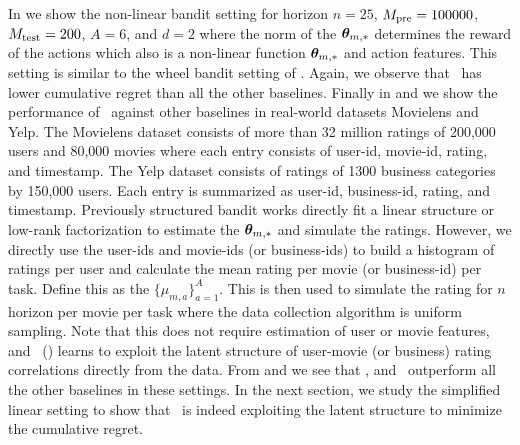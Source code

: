 \documentclass[10pt]{article}
\theoremstyle{plain}
\theoremstyle{definition}
\theoremstyle{remark}
\begin{document}
In  we show the non-linear bandit setting for horizon $n=25$, $M_{\text{pre}} = 100000$, $M_{\text{test}} = 200$, $A=6$, and $d=2$ where the norm of the $\boldsymbol{\theta}_{m,*}$ determines the reward of the actions which also is a non-linear function $\boldsymbol{\theta}_{m,*}$ and action features. This setting is similar to the wheel bandit setting of \citet{riquelme2018deep}. Again, we observe that \pred\ has lower cumulative regret than all the other baselines.
Finally in  and  we show the performance of \pred\ against other baselines in real-world datasets Movielens and Yelp. The Movielens dataset consists of more than 32 million ratings of 200,000 users and 80,000 movies \citep{harper2015movielens} where each entry consists of user-id, movie-id, rating, and timestamp. The Yelp dataset \citep{asghar2016yelp} consists of ratings of 1300 business categories by 150,000 users. Each entry is summarized as user-id, business-id, rating, and timestamp. Previously structured bandit works \citep{deshpande2012linear, hong2023multi} directly fit a linear structure or low-rank factorization to estimate the $\boldsymbol{\theta}_{m,*}$ and simulate the ratings. However, we directly use the user-ids and movie-ids (or business-ids) to build a histogram of ratings per user and calculate the mean rating per movie (or business-id) per task. Define this as the $\{\mu_{m,a}\}_{a=1}^A$. This is then used to simulate the rating for $n$ horizon per movie per task where the data collection algorithm is uniform sampling.
Note that this does not require estimation of user or movie features, and \pred\ (\gt) learns to exploit the latent structure of user-movie (or business) rating correlations directly from the data.
From  and  we see that \pred, and \predt\ outperform all the other baselines in these settings. In the next section, we study the simplified linear setting to show that \pred\ is indeed exploiting the latent structure to minimize the cumulative regret.
\end{document}

